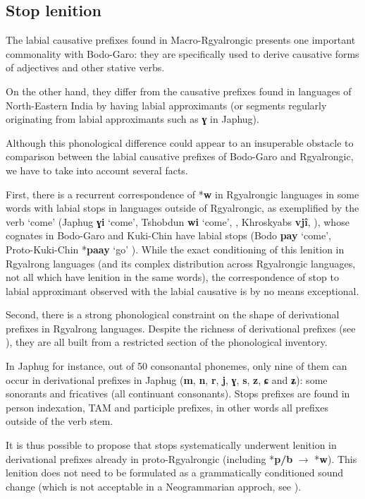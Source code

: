 \documentclass[oneside,a4paper,11pt]{article}
\newcommand{\ipa}[1]{\textbf{{\phon\mbox{#1}}}} %
\newcommand{\forme}[2]{\ipa{#1} `#2'}
\begin{document}
\subsection{Stop lenition}

The labial causative prefixes found in Macro-Rgyalrongic presents one important commonality with Bodo-Garo: they are specifically used to derive causative forms of adjectives and other stative verbs.

On the other hand, they differ from the causative prefixes found in languages of North-Eastern India by having labial approximants (or segments regularly originating from labial approximants such as \ipa{ɣ} in Japhug). 

Although this phonological difference could appear to an insuperable obstacle to comparison between the labial causative prefixes of Bodo-Garo and Rgyalrongic, we have to take into account several facts. 

First, there is a recurrent correspondence of *\ipa{w} in Rgyalrongic languages in some words with labial stops in languages outside of Rgyalrongic, as exemplified by the verb `come' (Japhug \forme{ɣi}{come}, Tshobdun \forme{wi}{come}, \citealt[237]{sun14generic}, Khroskyabs \ipa{vjî}, \citealt[276]{lai15person}), whose cognates in Bodo-Garo and Kuki-Chin have labial stops (Bodo \forme{pay}{come}, Proto-Kuki-Chin *\forme{paay}{go} \citealt{vanbik09pkc}). While the exact conditioning of this lenition in Rgyalrong languages (and its complex distribution across Rgyalrongic languages, not all which have lenition in the same words), the correspondence of stop to labial approximant observed with the labial causative is by no means exceptional.

Second, there is a strong phonological constraint on the shape of derivational prefixes in Rgyalrong languages. Despite the richness of derivational prefixes (see \citealt{jackson14morpho, jacques14antipassive}), they are all built from a restricted section of the phonological inventory.

In Japhug for instance, out of 50 consonantal phonemes, only nine of them can occur in derivational prefixes in Japhug (\ipa{m}, \ipa{n}, \ipa{r}, \ipa{j}, \ipa{ɣ}, \ipa{s}, \ipa{z}, \ipa{ɕ} and \ipa{ʑ}): some sonorants and fricatives (all continuant consonants). Stops prefixes are found in person indexation, TAM and participle prefixes, in other words all prefixes outside of the verb stem. 

It is thus possible to propose that stops systematically underwent lenition in derivational prefixes already in proto-Rgyalrongic (including *\ipa{p/b} $\rightarrow$ *\ipa{w}). This lenition does not need to be formulated as a grammatically conditioned sound change (which is not acceptable in a  Neogrammarian approch, see \citealt{hill14conditioned}). 
\end{document}
